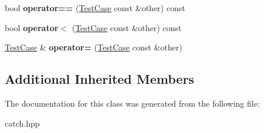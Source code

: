 \begin{DoxyCompactItemize}
\item 
bool {\bfseries operator==} (\hyperlink{classCatch_1_1TestCase}{Test\+Case} const \&other) const \hypertarget{classCatch_1_1TestCase_a40eab521b316c7d476f6b4dd1c33eec8}{}\label{classCatch_1_1TestCase_a40eab521b316c7d476f6b4dd1c33eec8}

\item 
bool {\bfseries operator$<$} (\hyperlink{classCatch_1_1TestCase}{Test\+Case} const \&other) const \hypertarget{classCatch_1_1TestCase_aa5174e85e3aac6e7398dee9c76730324}{}\label{classCatch_1_1TestCase_aa5174e85e3aac6e7398dee9c76730324}

\item 
\hyperlink{classCatch_1_1TestCase}{Test\+Case} \& {\bfseries operator=} (\hyperlink{classCatch_1_1TestCase}{Test\+Case} const \&other)\hypertarget{classCatch_1_1TestCase_a8022e3f74232f7887d2d2cbbc8876502}{}\label{classCatch_1_1TestCase_a8022e3f74232f7887d2d2cbbc8876502}

\end{DoxyCompactItemize}
\subsection*{Additional Inherited Members}


The documentation for this class was generated from the following file\+:\begin{DoxyCompactItemize}
\item 
catch.\+hpp\end{DoxyCompactItemize}
